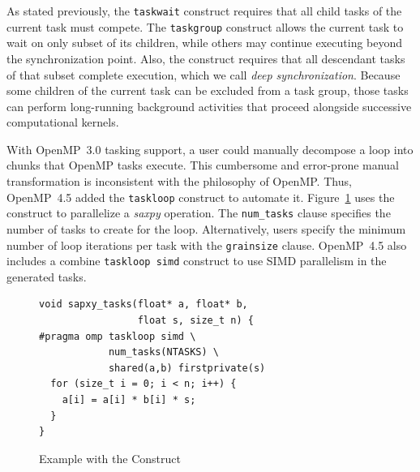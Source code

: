As stated previously, the \texttt{taskwait} construct requires that all child 
tasks of the current task must compete. The \texttt{taskgroup} construct 
allows the current task to wait on only subset of its children, while others 
may continue executing beyond the synchronization point. Also, the construct
requires that all descendant tasks of that subset complete execution, which
we call \emph{deep synchronization}. Because some children of the current 
task can be excluded from a task group, those tasks can perform long-running 
background activities that proceed alongside successive computational kernels.

\label{sec:Taskloop}
With OpenMP~3.0 tasking support, a user could manually decompose a loop into 
chunks that OpenMP tasks execute. This cumbersome and error-prone manual 
transformation is inconsistent with the philosophy of OpenMP. Thus, OpenMP~4.5
added the \texttt{taskloop} construct to automate it. 
Figure~\ref{fig:TaskloopExample} uses the construct to parallelize a 
\emph{saxpy} operation. The \texttt{num\_tasks} clause specifies the number of 
tasks to create for the loop. Alternatively, users specify the minimum number 
of loop iterations per task with the \texttt{grainsize} clause. OpenMP~4.5
also includes a combine \texttt{taskloop simd} construct to use SIMD 
parallelism in the generated tasks.

\begin{figure}
\begin{verbatim}
void sapxy_tasks(float* a, float* b,
                 float s, size_t n) {
#pragma omp taskloop simd \
            num_tasks(NTASKS) \
            shared(a,b) firstprivate(s)
  for (size_t i = 0; i < n; i++) {
    a[i] = a[i] * b[i] * s;
  }
}
\end{verbatim}
\caption{Example with the  Construct\label{fig:TaskloopExample}}
\end{figure}
